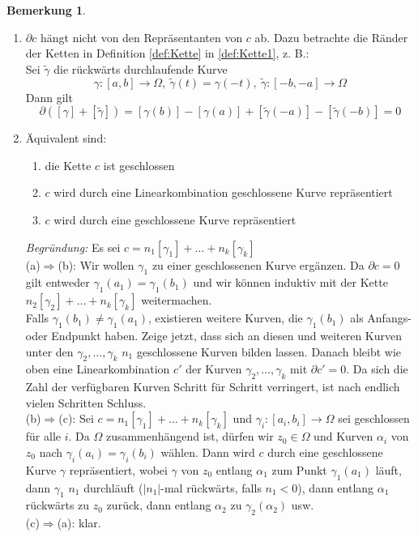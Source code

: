 \documentclass[11pt,titlepage]{article}
\theoremstyle{definition}
\newtheorem{remark}[theorem]{Bemerkung}
\theoremstyle{remark}
\begin{document}
	\begin{remark} \label{rem:3.3}
		\begin{enumerate}
			\item	$\partial c$ hängt nicht von den Repräsentanten von $c$ ab. Dazu betrachte die 
			Ränder der Ketten in Definition \ref{def:Kette} in \ref{def:Kette1}, z. B.: \\
			Sei $\tilde{\gamma}$ die rückwärts durchlaufende Kurve
			\[\gamma:[a,b]\to\Omega,\ \tilde{\gamma}(t)=\gamma(-t),\ \tilde{\gamma}:[-b,-a]\to\Omega \]
			Dann gilt
			\[\partial([\gamma]+[\tilde{\gamma}])=[\gamma(b)]-[\gamma(a)]+[\tilde{\gamma}(-a)]-
			[\tilde{\gamma}(-b)]=0 \]
			
			\item Äquivalent sind:
			\begin{enumerate}
				\item die Kette $c$ ist geschlossen
				\item $c$ wird durch eine Linearkombination geschlossene Kurve repräsentiert
				\item $c$ wird durch eine geschlossene Kurve repräsentiert
			\end{enumerate}
			\textsl{Begründung:} Es sei $c=n_1 [\gamma_1]+\ldots+n_k[\gamma_k]$ \\
			(a)$\Rightarrow$(b): Wir wollen $\gamma_1$ zu einer geschlossenen Kurve ergänzen. 
			Da $\partial c=0$ gilt entweder $\gamma_1(a_1)=\gamma_1(b_1)$ und wir können induktiv 
			mit der Kette $n_2 [\gamma_2]+\ldots+n_k[\gamma_k]$ weitermachen. \\
			Falls $\gamma_1(b_1)\neq\gamma_1(a_1)$, existieren weitere Kurven, die $\gamma_1(b_1)$ 
			als Anfangs- oder Endpunkt haben. Zeige jetzt, dass sich an diesen und weiteren Kurven 
			unter den $\gamma_2,\ldots,\gamma_k$ $n_1$ geschlossene Kurven bilden lassen. 
			Danach bleibt wie oben eine Linearkombination $c'$ der Kurven $\gamma_2,\ldots,\gamma_k$ 
			mit $\partial c'=0$. Da sich die Zahl der verfügbaren Kurven Schritt für Schritt verringert, 
			ist nach endlich vielen Schritten Schluss. \\
			(b)$\Rightarrow$(c): Sei $c=n_1[\gamma_1]+\ldots+n_k[\gamma_k]$ und 
			$\gamma_i :[a_i,b_i]\to\Omega$ sei geschlossen für alle $i$. Da $\Omega$ zusammenhängend 
			ist, dürfen wir $z_0\in\Omega$ und Kurven $\alpha_i$ von $z_0$ nach $\gamma_i(a_i)=
			\gamma_i(b_i)$ wählen. Dann wird $c$ durch eine geschlossene Kurve $\gamma$ 
			repräsentiert, wobei $\gamma$ von $z_0$ entlang $\alpha_1$ zum Punkt $\gamma_1(a_1)$ 
			läuft, dann $\gamma_1$ $n_1$ durchläuft ($|n_1|$-mal rückwärts, falls $n_1<0$), dann 
			entlang $\alpha_1$ rückwärts zu $z_0$ zurück, dann entlang $\alpha_2$ zu 
			$\gamma_2(\alpha_2)$ usw. \\
			(c)$\Rightarrow$(a): klar.
		\end{enumerate}
	\end{remark}
\end{document}
